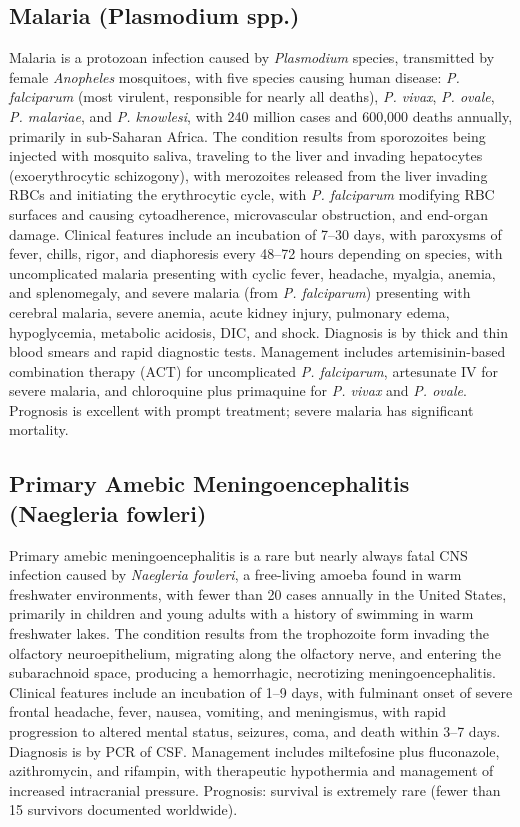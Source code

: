 \subsection{Malaria (Plasmodium spp.)}
\label{sec:Malaria}
Malaria is a protozoan infection caused by \textit{Plasmodium} species, transmitted by female \textit{Anopheles} mosquitoes, with five species causing human disease: \textit{P. falciparum} (most virulent, responsible for nearly all deaths), \textit{P. vivax}, \textit{P. ovale}, \textit{P. malariae}, and \textit{P. knowlesi}, with 240 million cases and 600,000 deaths annually, primarily in sub-Saharan Africa. The condition results from sporozoites being injected with mosquito saliva, traveling to the liver and invading hepatocytes (exoerythrocytic schizogony), with merozoites released from the liver invading RBCs and initiating the erythrocytic cycle, with \textit{P. falciparum} modifying RBC surfaces and causing cytoadherence, microvascular obstruction, and end-organ damage. Clinical features include an incubation of 7--30 days, with paroxysms of fever, chills, rigor, and diaphoresis every 48--72 hours depending on species, with uncomplicated malaria presenting with cyclic fever, headache, myalgia, anemia, and splenomegaly, and severe malaria (from \textit{P. falciparum}) presenting with cerebral malaria, severe anemia, acute kidney injury, pulmonary edema, hypoglycemia, metabolic acidosis, DIC, and shock. Diagnosis is by thick and thin blood smears and rapid diagnostic tests. Management includes artemisinin-based combination therapy (ACT) for uncomplicated \textit{P. falciparum}, artesunate IV for severe malaria, and chloroquine plus primaquine for \textit{P. vivax} and \textit{P. ovale}. Prognosis is excellent with prompt treatment; severe malaria has significant mortality.

\subsection{Primary Amebic Meningoencephalitis (Naegleria fowleri)}
\label{sec:Naegleria fowleri}
Primary amebic meningoencephalitis is a rare but nearly always fatal CNS infection caused by \textit{Naegleria fowleri}, a free-living amoeba found in warm freshwater environments, with fewer than 20 cases annually in the United States, primarily in children and young adults with a history of swimming in warm freshwater lakes. The condition results from the trophozoite form invading the olfactory neuroepithelium, migrating along the olfactory nerve, and entering the subarachnoid space, producing a hemorrhagic, necrotizing meningoencephalitis. Clinical features include an incubation of 1--9 days, with fulminant onset of severe frontal headache, fever, nausea, vomiting, and meningismus, with rapid progression to altered mental status, seizures, coma, and death within 3--7 days. Diagnosis is by PCR of CSF. Management includes miltefosine plus fluconazole, azithromycin, and rifampin, with therapeutic hypothermia and management of increased intracranial pressure. Prognosis: survival is extremely rare (fewer than 15 survivors documented worldwide).

